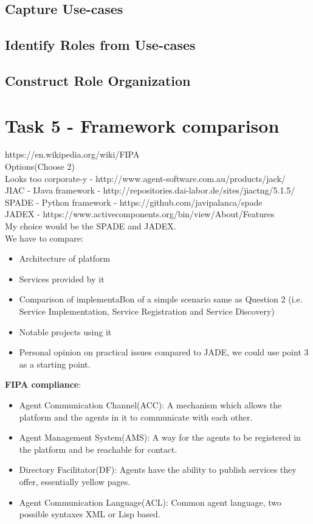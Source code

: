 \documentclass[a4paper, 11pt]{article}
\begin{document}
\subsection{Capture Use-cases}
\subsection{Identify Roles from Use-cases}
\subsection{Construct Role Organization}
\section{Task 5 - Framework comparison}

https://en.wikipedia.org/wiki/FIPA \\
Options(Choose 2) \\
Looks too corporate-y - http://www.agent-software.com.au/products/jack/ \\
JIAC - IJava framework - http://repositories.dai-labor.de/sites/jiactng/5.1.5/ \\
SPADE - Python framework - https://github.com/javipalanca/spade \\
JADEX - https://www.activecomponents.org/bin/view/About/Features \\

My choice would be the SPADE and JADEX. \\

We have to compare:
\begin{itemize}
	\item Architecture of platform
	\item Services provided by it
	\item Comparison of implementaBon of a simple scenario	same as	Question 2 (i.e.	Service Implementation,	Service	Registration and Service Discovery)
	\item Notable projects using it
	\item Personal opinion on practical issues compared to JADE, we could use point 3 as a starting point.
\end{itemize}

\textbf{FIPA compliance}: 
\begin{itemize}
	\item Agent Communication Channel(ACC): A mechanism which allows the platform and the agents in it to communicate with each other.
	\item Agent Management System(AMS): A way for the agents to be registered in the platform and be reachable for contact.
	\item Directory Facilitator(DF): Agents have the ability to publish services they offer, essentially yellow pages.
	\item Agent Communication Language(ACL): Common agent language, two possible syntaxes XML or Lisp based.
\end{itemize}
\end{document}
